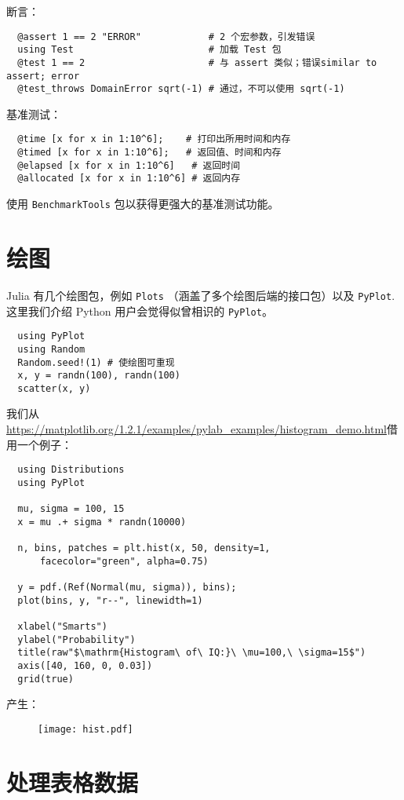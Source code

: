\documentclass[10pt,a4paper]{article}
\begin{document}
断言：
\begin{lstlisting}
  @assert 1 == 2 "ERROR"            # 2 个宏参数，引发错误
  using Test                        # 加载 Test 包
  @test 1 == 2                      # 与 assert 类似；错误similar to assert; error
  @test_throws DomainError sqrt(-1) # 通过，不可以使用 sqrt(-1)
\end{lstlisting}

基准测试：
\begin{lstlisting}
  @time [x for x in 1:10^6];    # 打印出所用时间和内存
  @timed [x for x in 1:10^6];   # 返回值、时间和内存
  @elapsed [x for x in 1:10^6]   # 返回时间
  @allocated [x for x in 1:10^6] # 返回内存
\end{lstlisting}
使用 \lstinline|BenchmarkTools| 包以获得更强大的基准测试功能。

\section{绘图}
Julia 有几个绘图包，例如 \lstinline|Plots| （涵盖了多个绘图后端的接口包）以及 \lstinline|PyPlot|.
这里我们介绍 Python 用户会觉得似曾相识的 \lstinline|PyPlot|。
\begin{lstlisting}
  using PyPlot
  using Random
  Random.seed!(1) # 使绘图可重现
  x, y = randn(100), randn(100)
  scatter(x, y)
\end{lstlisting}

我们从\url{https://matplotlib.org/1.2.1/examples/pylab_examples/histogram_demo.html}借用一个例子：
\begin{lstlisting}
  using Distributions
  using PyPlot

  mu, sigma = 100, 15
  x = mu .+ sigma * randn(10000)

  n, bins, patches = plt.hist(x, 50, density=1,
      facecolor="green", alpha=0.75)

  y = pdf.(Ref(Normal(mu, sigma)), bins);
  plot(bins, y, "r--", linewidth=1)

  xlabel("Smarts")
  ylabel("Probability")
  title(raw"$\mathrm{Histogram\ of\ IQ:}\ \mu=100,\ \sigma=15$")
  axis([40, 160, 0, 0.03])
  grid(true)
\end{lstlisting}

产生：
\begin{figure}[h]
\centering
\texttt{[image: hist.pdf]}
\end{figure}

\section{处理表格数据}
\end{document}

